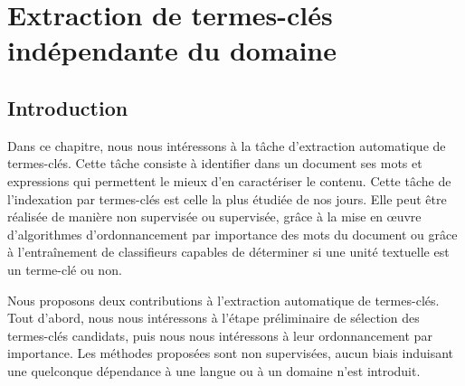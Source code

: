 \chapter{Extraction de termes-clés indépendante du domaine}
\label{chap:main-domain_independent_keyphrase_extraction}


  \section{Introduction}
  \label{sec:main:domain_independent_keyphrase_extraction-introduction}
    Dans ce chapitre, nous nous intéressons à la tâche d'extraction automatique
    de termes-clés. Cette tâche consiste à identifier dans un document ses mots
    et expressions qui permettent le mieux d'en caractériser le contenu. Cette
    tâche de l'indexation par termes-clés est celle la plus étudiée de nos
    jours. Elle peut être réalisée de manière non supervisée ou supervisée,
    grâce à la mise en \oe{}uvre d'algorithmes d'ordonnancement par importance
    des mots du document ou grâce à l'entraînement de classifieurs capables de
    déterminer si une unité textuelle est un terme-clé ou non.

    Nous proposons deux contributions à l'extraction automatique de termes-clés.
    Tout d'abord, nous nous intéressons à l'étape préliminaire de sélection des
    termes-clés candidats, puis nous nous intéressons à leur ordonnancement par
    importance. Les méthodes proposées sont non supervisées, aucun biais
    induisant une quelconque dépendance à une langue ou à un domaine n'est
    introduit.



